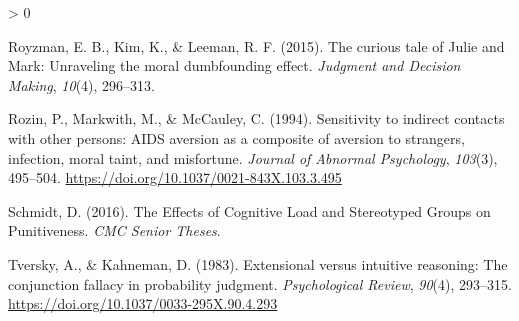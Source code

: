 \documentclass[
  american,
  man,floatsintext]{apa7}
\newlength{\cslhangindent}
\newenvironment{CSLReferences}[2] %
 {%
  \setlength{\parindent}{0pt}
  \ifodd #1 \everypar{\setlength{\hangindent}{\cslhangindent}}\ignorespaces\fi
  \ifnum #2 > 0
  \setlength{\parskip}{#2\baselineskip}
  \fi
 }%
 {}
\begin{document}
\begin{CSLReferences}{1}{0}
\leavevmode\hypertarget{ref-royzman_curious_2015}{}%
Royzman, E. B., Kim, K., \& Leeman, R. F. (2015). The curious tale of {Julie} and {Mark}: Unraveling the moral dumbfounding effect. \emph{Judgment and Decision Making}, \emph{10}(4), 296--313.

\leavevmode\hypertarget{ref-rozin_sensitivity_1994}{}%
Rozin, P., Markwith, M., \& McCauley, C. (1994). Sensitivity to indirect contacts with other persons: {AIDS} aversion as a composite of aversion to strangers, infection, moral taint, and misfortune. \emph{Journal of Abnormal Psychology}, \emph{103}(3), 495--504. \url{https://doi.org/10.1037/0021-843X.103.3.495}

\leavevmode\hypertarget{ref-schmidt_effects_2016}{}%
Schmidt, D. (2016). The {Effects} of {Cognitive Load} and {Stereotyped Groups} on {Punitiveness}. \emph{CMC Senior Theses}.

\leavevmode\hypertarget{ref-tversky_extensional_1983}{}%
Tversky, A., \& Kahneman, D. (1983). Extensional versus intuitive reasoning: The conjunction fallacy in probability judgment. \emph{Psychological Review}, \emph{90}(4), 293--315. \url{https://doi.org/10.1037/0033-295X.90.4.293}

\end{CSLReferences}


\clearpage
\renewcommand{\listfigurename}{Figure captions}

\clearpage
\renewcommand{\listtablename}{Table captions}
\end{document}
